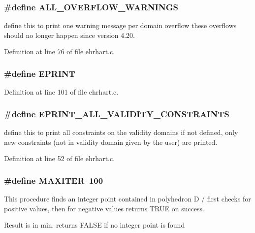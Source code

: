 \subsubsection{\setlength{\rightskip}{0pt plus 5cm}\#define ALL\_\-OVERFLOW\_\-WARNINGS}\label{ehrhart_8c_a2}


define this to print one warning message per domain overflow these overflows should no longer happen since version 4.20.



Definition at line 76 of file ehrhart.c.
\subsubsection{\setlength{\rightskip}{0pt plus 5cm}\#define EPRINT}\label{ehrhart_8c_a3}




Definition at line 101 of file ehrhart.c.
\subsubsection{\setlength{\rightskip}{0pt plus 5cm}\#define EPRINT\_\-ALL\_\-VALIDITY\_\-CONSTRAINTS}\label{ehrhart_8c_a0}


define this to print all constraints on the validity domains if not defined, only new constraints (not in validity domain given by the user) are printed.



Definition at line 52 of file ehrhart.c.
\subsubsection{\setlength{\rightskip}{0pt plus 5cm}\#define MAXITER\ 100}\label{ehrhart_8c_a4}


This procedure finds an integer point contained in polyhedron D / first checks for positive values, then for negative values returns TRUE on success.

Result is in min. returns FALSE if no integer point is found





